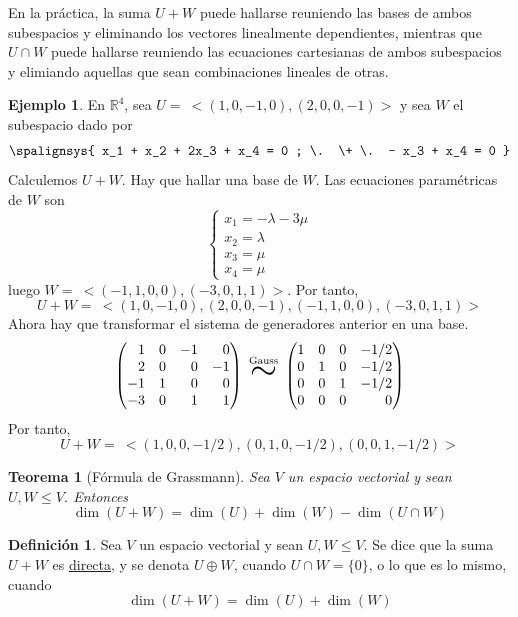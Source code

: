 \documentclass[12pt]{report}
\newtheorem{theorem}{Teorema}[chapter]
\theoremstyle{definition}
\newtheorem{definition}{Definición}[chapter]
\theoremstyle{definition}
\newtheorem{example}{Ejemplo}[chapter]
\theoremstyle{remark}
\newcommand*{\Scale}[2][4]{\scalebox{#1}{$#2$}}%
\newcommand{\R}{\mathbb R}
\begin{document}
En la práctica, la suma $U + W$ puede hallarse reuniendo las bases de ambos subespacios y eliminando los vectores linealmente dependientes, mientras que $U \cap W$ puede hallarse reuniendo las ecuaciones cartesianas de ambos subespacios y elimiando aquellas que sean combinaciones lineales de otras.

\begin{example}
En $\R^4$, sea $U = \ <(1,0,-1,0),(2,0,0,-1)>$ y sea $W$ el subespacio dado por
\[
\spalignsys{
x_1 + x_2 + 2x_3 + x_4 = 0 ;
\. \+ \. - x_3 + x_4 = 0
}\]
Calculemos $U + W$. Hay que hallar una base de $W$. Las ecuaciones paramétricas de $W$ son
\[
\begin{cases}
    x_1=-\lambda-3\mu \\
    x_2=\lambda \\
    x_3 = \mu \\
    x_4 = \mu
\end{cases}
\]
luego $W = \ <(-1,1,0,0),(-3,0,1,1)>$. Por tanto,
\[U+W= \ <(1,0,-1,0),(2,0,0,-1),(-1,1,0,0),(-3,0,1,1)>\]
Ahora hay que transformar el sistema de generadores anterior en una base.
\[
\begin{pmatrix*}[r]
    1 & 0 & -1 & 0 \\
    2 & 0 & 0 & -1 \\
    -1 & 1 & 0 & 0 \\
    -3 & 0 & 1 & 1
\end{pmatrix*}
\ \overset{\textrm{\scriptsize Gauss}}{\Scale[2.5]{\sim}} \
\begin{pmatrix*}[r]
    1 & 0 & 0 & -1/2 \\
    0 & 1 & 0 & -1/2 \\
    0 & 0 & 1 & -1/2 \\
    0 & 0 & 0 & 0
\end{pmatrix*}
\]
Por tanto,
\[U+W = \ <(1,0,0,-1/2),(0,1,0,-1/2),(0,0,1,-1/2)>\]
\end{example}

\begin{theorem}[Fórmula de Grassmann]
Sea $V$ un espacio vectorial y sean $U,W \leq V$. Entonces
\[\dim(U+W)=\dim(U)+\dim(W)-\dim(U \cap W)\]
\end{theorem}

\begin{definition}
Sea $V$ un espacio vectorial y sean $U,W \leq V$. Se dice que la suma $U+W$ es \ul{directa}, y se denota $U \oplus W$, cuando $U \cap W = \{0\}$, o lo que es lo mismo, cuando 
\[\dim(U+W)=\dim(U)+\dim(W)\]
\end{definition}
\end{document}
